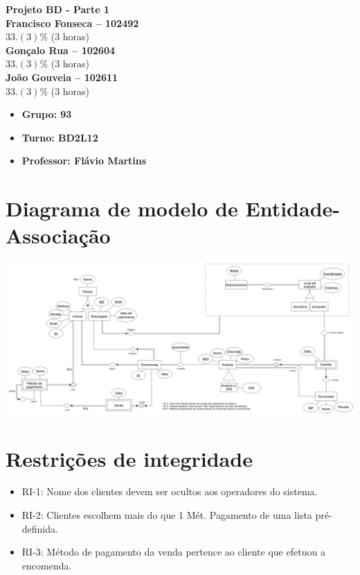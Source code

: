 \documentclass{article}
\begin{document}
\begin{titlepage}
    \vspace*{\fill}
    \begin{center}
        {\Huge\bfseries Projeto BD - Parte 1\\}
        \vspace{1cm}
        {\Large\bfseries Francisco Fonseca -- 102492}\\[5pt]
        $33.(3)\%$ (3 horas)\\[14pt]
        {\Large\bfseries Gonçalo Rua -- 102604}\\[5pt]
        $33.(3)\%$ (3 horas)\\[14pt]
        {\Large\bfseries João Gouveia -- 102611}\\[5pt]
        $33.(3)\%$ (3 horas)\\[14pt]
    \end{center}
    \vspace*{\fill}

    \vspace{0.5cm}

    \begin{itemize}
        \item[] \Large\bfseries Grupo: 93
        \item[] \Large\bfseries Turno: BD2L12
        \item[] \Large\bfseries Professor: Flávio Martins
    \end{itemize}

\end{titlepage}

\section{Diagrama de modelo de Entidade-Associação}

\vspace{0.5cm}
\includegraphics[scale=0.2]{diagrama.png}
\vspace{0.5cm}

\section{Restrições de integridade}

\begin{itemize}
    \item RI-1: Nome dos clientes devem ser ocultos aos operadores do sistema.
    \item RI-2: Clientes escolhem mais do que 1 Mét. Pagamento de uma lista pré-definida.
    \item RI-3: Método de pagamento da venda pertence ao cliente que efetuou a encomenda.
\end{itemize}
\end{document}

